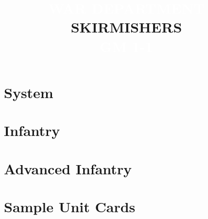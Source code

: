 \documentclass{article}
\begin{document}
\newpage

\section{System}



\newpage

\section{Infantry}



\newpage

\section{Advanced Infantry}



\newpage

\section{Sample Unit Cards}



\newpage


\clearpage

\setlength{\headsep}{25pt}

\title{
  \selectfont
  \vspace{6px}
  \fontsize{45}{55}\selectfont\textcolor{white}{\MakeUppercase{War Department}}\\
  \fontsize{45}{55}\selectfont\MakeUppercase{Skirmishers}\\
  \fontsize{45}{55}\selectfont\textcolor{white}{\MakeUppercase{GM 1-1}}\\
}
\end{document}
